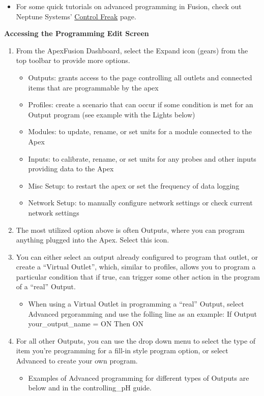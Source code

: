 \documentclass[]{book}
\providecommand{\tightlist}{%
  \setlength{\itemsep}{0pt}\setlength{\parskip}{0pt}}
\begin{document}
\begin{itemize}
\tightlist
\item
  For some quick tutorials on advanced programming in Fusion, check out
  Neptune Systems'
  \href{https://www.neptunesystems.com/getstarted/apexng/apex-control-freak-advanced/}{Control
  Freak} page.
\end{itemize}

 \textbf{Accessing the Programming Edit Screen}

\begin{enumerate}
\def\labelenumi{\arabic{enumi}.}
\tightlist
\item
  From the ApexFusion Dashboard, select the Expand icon (gears) from the
  top toolbar to provide more options.

  \begin{itemize}
  \tightlist
  \item
    Outputs: grants access to the page controlling all outlets and
    connected items that are programmable by the apex
  \item
    Profiles: create a scenario that can occur if some condition is met
    for an Output program (see example with the Lights below)
  \item
    Modules: to update, rename, or set units for a module connected to
    the Apex
  \item
    Inputs: to calibrate, rename, or set units for any probes and other
    inputs providing data to the Apex
  \item
    Misc Setup: to restart the apex or set the frequency of data logging
  \item
    Network Setup: to manually configure network settings or check
    current network settings
  \end{itemize}
\item
  The most utilized option above is often Outputs, where you can program
  anything plugged into the Apex. Select this icon.
\item
  You can either select an output already configured to program that
  outlet, or create a ``Virtual Outlet'', which, similar to profiles,
  allows you to program a particular condition that if true, can trigger
  some other action in the program of a ``real'' Output.

  \begin{itemize}
  \tightlist
  \item
    When using a Virtual Outlet in programming a ``real'' Output, select
    Advanced prgoramming and use the folling line as an example: If
    Output your\_output\_name = ON Then ON
  \end{itemize}
\item
  For all other Outputs, you can use the drop down menu to select the
  type of item you're programming for a fill-in style program option, or
  select Advanced to create your own program.

  \begin{itemize}
  \tightlist
  \item
    Examples of Advanced programming for different types of Outputs are
    below and in the controlling\_pH guide.
  \end{itemize}
\end{enumerate}
\end{document}
